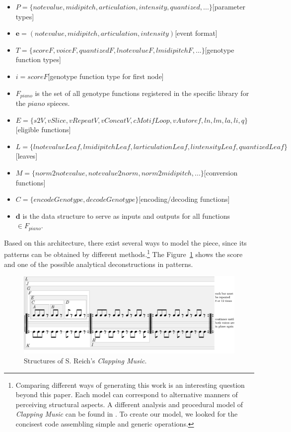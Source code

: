 \documentclass{article}
\renewcommand{\vec}[1]{\mathbf{#1}}
\begin{document}
\begin{itemize}
\item $P = \{notevalue, midipitch, articulation, intensity, quantized, ...\}$\hfill[parameter types]
\item $\vec{e} = (notevalue, midipitch, articulation, intensity)$\hfill[event format] 
\item $T = \{scoreF, voiceF, quantizedF, lnotevalueF, lmidipitchF, ...\}$\hfill[genotype function types] 
\item $i = scoreF$\hfill[genotype function type for first node]
\item $F_{piano}$ is the set of all genotype functions registered in the specific library for the $piano$ spieces.
\item $E = \{s2V, vSlice, vRepeatV, vConcatV, cMotifLoop, vAutoref, ln, lm, la, li, q\}$\hfill[eligible functions]
\item $L = \{lnotevalueLeaf, lmidipitchLeaf, larticulationLeaf, lintensityLeaf, quantizedLeaf\}$\hfill[leaves]
\item $M = \{norm2notevalue, notevalue2norm, norm2midipitch, ...\}$\hfill[conversion functions]
\item $C = \{encodeGenotype, decodeGenotype\}$\hfill[encoding/decoding functions]
\item $\vec{d}$ is the data structure to serve as inputs and outputs for all functions $\in F_{piano}$.
\end{itemize}


Based on this architecture, there exist several ways to model the piece, since its patterns can be obtained by different methods.\footnote{Comparing different ways of generating this work is an interesting question beyond this paper. Each model can correspond to alternative manners of perceiving structural aspects. A different analysis and procedural model of \emph{Clapping Music} can be found in \cite{MPS-manual}. To create our model, we looked for the concisest code assembling simple and generic operations.} The Figure~\ref{fig:clappingstruct} shows the score and one of the possible analytical deconstructions in patterns. 

\begin{figure}[H]
  \includegraphics[width=\linewidth]{figs/clapping_patterns.pdf}
  \caption{Structures of S. Reich's \emph{Clapping Music}.}
  \label{fig:clappingstruct}
\end{figure}
\end{document}
